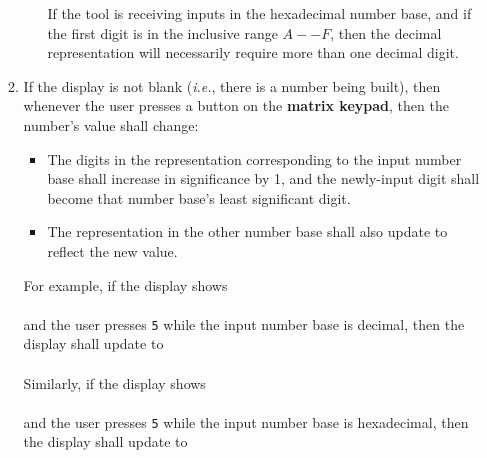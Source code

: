 \begin{enumerate}
\begin{enumerate}
\begin{itemize}
                    If the tool is receiving inputs in the hexadecimal number base, and if the first digit is in the inclusive range $A--F$, then the decimal representation will necessarily require more than one decimal digit.
            \end{itemize}
        \item \label{spec:BuildingValue} If the display is not blank (\textit{i.e.}, there is a number being built), then whenever the user presses a button on the \textbf{matrix keypad}, then the number's value shall change:
            \begin{itemize}
                \item The digits in the representation corresponding to the input number base shall increase in significance by 1, and the newly-input digit shall become that number base's least significant digit.
                \item The representation in the other number base shall also update to reflect the new value.
            \end{itemize}
            For example, if the display shows \\
             \\
            and the user presses \texttt{5} while the input number base is decimal, then the display shall update to \\
             \\
            Similarly, if the display shows \\
             \\
            and the user presses \texttt{5} while the input number base is hexadecimal, then the display shall update to \\
\end{enumerate}
\end{enumerate}
